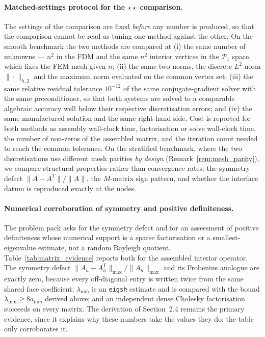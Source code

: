 \documentclass[11pt,a4paper]{article}
\theoremstyle{definition}
\theoremstyle{remark}
\begin{document}
\paragraph{Matched-settings protocol for the $\star\star$ comparison.}
The settings of the comparison are fixed \emph{before} any number is produced, so that the comparison cannot be read as tuning one method against the other. On the smooth benchmark the two methods are compared at
(i) the same number of unknowns --- $n^2$ in the FDM and the same $n^2$ interior vertices in the $\mathcal{P}_1$ space, which fixes the FEM mesh given $n$;
(ii) the same two norms, the discrete $L^2$ norm $\|\cdot\|_{h,2}$ and the maximum norm evaluated on the common vertex set;
(iii) the same relative residual tolerance $10^{-12}$ of the same conjugate-gradient solver with the same preconditioner, so that both systems are solved to a comparable algebraic accuracy well below their respective discretisation errors; and
(iv) the same manufactured solution and the same right-hand side.
Cost is reported for both methods as assembly wall-clock time, factorisation or solve wall-clock time, the number of non-zeros of the assembled matrix, and the iteration count needed to reach the common tolerance.
On the stratified benchmark, where the two discretisations use different mesh parities \emph{by design} (Remark~\ref{rem:mesh_parity}), we compare structural properties rather than convergence rates: the symmetry defect $\|A-A^T\|/\|A\|$, the $M$-matrix sign pattern, and whether the interface datum is reproduced exactly at the nodes.

\paragraph{Numerical corroboration of symmetry and positive definiteness.}
The problem pack asks for the symmetry defect and for an assessment of positive
definiteness whose numerical support is a sparse factorisation or a
smallest-eigenvalue estimate, not a random Rayleigh quotient. Table~\ref{tab:matrix_evidence} reports
both for the assembled interior operator. The symmetry defect
$\|A_h-A_h^{\mathsf T}\|_{\max}/\|A_h\|_{\max}$ and its Frobenius analogue are
exactly zero, because every off-diagonal entry is written twice from the same
shared face coefficient; $\lambda_{\min}$ is an \texttt{eigsh} estimate and is
compared with the bound $\lambda_{\min}\ge 8a_{\min}$ derived above; and an
independent dense Cholesky factorisation succeeds on every matrix. The
derivation of Section~2.4 remains the primary evidence, since it explains why
these numbers take the values they do; the table only corroborates it.
\end{document}
